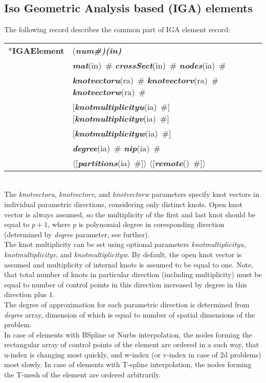 \documentclass[a4paper]{article}
\makeatletter
\newcommand{\param}[1]{{\em #1}}
\newcommand{\fieldVal}[2]{\mbox{({\it\bf{#1}\#)\tiny (#2)}}}
\newcommand{\keywordnotype}[1]{\mbox{{\it{\bf{#1}}}}}
\newcommand{\keyword}[2]{\mbox{{\keywordnotype{#1}\tiny (#2)}}}
\newcommand{\entKeyword}[1]{\mbox{{*{\bf{#1}}}}}
\newcommand{\field}[2]{\mbox{\keyword{#1}{#2}~\#}}
\newcommand{\optField}[2]{\mbox{[\field{#1}{#2}]}}
\newcommand{\PoptField}[2]{\mbox{$\langle$[\field{#1}{#2}]$\rangle$}}
\newenvironment{record}[1][]{\begin{tabular}{|ll}}{\end{tabular}\\}
\newcommand{\recentry}[2]{{#1}&{#2}\\}
\newcounter{rcc}
\newenvironment{record}[1][\textwidth]{\setcounter{rcc}{0}\begin{tabular*}{#1}{|ll@{\extracolsep{\fill}}r}}{\end{tabular*}\\}
\newcommand{\recentry}[2]{\ifthenelse{\value{rcc}>0}{&$\backslash$ \\}{\setcounter{rcc}{1}}{#1}&{#2}}
\makeatother
\begin{document}
\subsection{Iso Geometric Analysis based (IGA) elements}
The following record describes the common part of IGA element record:
 
\noindent
\begin{record}
  \recentry{\entKeyword{IGAElement}}{\fieldVal{num}{in}}
  \recentry{}{\field{mat}{in} \field{crossSect}{in} \field{nodes}{ia}}
  \recentry{}{\field{knotvectoru}{ra} \field{knotvectorv}{ra} \field{knotvectorw}{ra}}
  \recentry{}{\optField{knotmultiplicityu}{ia} \optField{knotmultiplicityv}{ia}}
  \recentry{}{\optField{knotmultiplicityw}{ia}}
  \recentry{}{\field{degree}{ia} \field{nip}{ia}}
  \recentry{}{\PoptField{partitions}{ia} \PoptField{remote}{}}
\end{record}
The \param{knotvectoru}, \param{knotvectorv}, and \param{knotvectorw} parameters specify  knot vectors in individual parametric directions, considering only distinct knots. Open knot vector is always assumed, so the multiplicity of the first and last knot should be equal to $p+1$, where $p$ is polynomial degree in coresponding direction (determined by \param{degree} parameter, see further).\\
The knot multiplicity can be set using optional parameters \param{knotmultiplicityu}, \param{knotmultiplicityv}, and \param{knotmultiplicityw}. By default, the open knot vector is assumed and multiplicity of internal knots is assumed to be equal to one. Note, that total number of knots in particular direction (including multiplicity) must be equal to number of control points in this direction increased by degree in this direction plus 1.\\
The degree of approximation for each parametric direction is determined from \param{degree} array, dimension of which is equal to number of spatial dimensions of the problem.\\
In case of elements with BSpline or Nurbs interpolation, the nodes forming the rectangular array of control points of the element are ordered in a such way, that u-index is changing most quickly, and w-index (or v-index in case of 2d problems) most slowly. In case of elements with T-spline interpolation, the nodes forming the T-mesh of the element are ordered arbitrarily.
\end{document}
